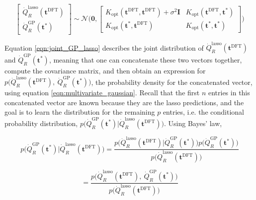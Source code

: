 \documentclass{article}
\begin{document}
\begin{equation}
  \label{eqn:joint_GP_lasso}
  \begin{bmatrix}
  \dot{Q}_{R}^{\text{lasso}}(\boldsymbol{t}^{\text{DFT}}) \\
  \dot{Q}_{R}^{\text{GP}}(\boldsymbol{t}^*)
  \end{bmatrix} \sim 
  \mathcal{N} \Bigg(\boldsymbol{0}, 
  \begin{bmatrix}
 K_{\text{opt}}(\boldsymbol{t}^{\text{DFT}}, \boldsymbol{t}^{\text{DFT}}) + \sigma^2\boldsymbol{I}& K_{\text{opt}}(\boldsymbol{t}^{\text{DFT}}, \boldsymbol{t}^*) \\ 
   K_{\text{opt}}(\boldsymbol{t}^*, \boldsymbol{t}^{\text{DFT}}) &  K_{\text{opt}}(\boldsymbol{t}^*, \boldsymbol{t}^*) 
  \end{bmatrix}
  \Bigg)
\end{equation}

Equation \ref{eqn:joint_GP_lasso} describes the joint distribution of $\dot{Q}_{R}^{\text{lasso}}(\boldsymbol{t}^{\text{DFT}})$ and $\dot{Q}_{R}^{\text{GP}}(\boldsymbol{t}^*)$, meaning that one can concatenate these two vectors together, compute the covariance matrix, and then obtain an expression for $p\Big(\dot{Q}_{R}^{\text{lasso}}(\boldsymbol{t}^{\text{DFT}}), \  \dot{Q}_{R}^{\text{GP}}(\boldsymbol{t}^*)\Big)$, the probability density for the concatenated vector, using equation \ref{eqn:multivariate_gaussian}. Recall that the first $n$ entries in this concatenated vector are known because they are the lasso predictions, and the goal is to learn the distribution for the remaining $p$ entries, i.e. the conditional probability distribution, $p\Big(\dot{Q}_{R}^{\text{GP}}(\boldsymbol{t}^*)  \Big| \dot{Q}_{R}^{\text{lasso}}(\boldsymbol{t}^{\text{DFT}})  \Big)$. Using Bayes' law, 

$$
p\Big(\dot{Q}_{R}^{\text{GP}}(\boldsymbol{t}^*)  \Big| \dot{Q}_{R}^{\text{lasso}}(\boldsymbol{t}^{\text{DFT}})  \Big) = \frac{p\Big(\dot{Q}_{R}^{\text{lasso}}(\boldsymbol{t}^{\text{DFT}})  \Big| \dot{Q}_{R}^{\text{GP}}(\boldsymbol{t}^*)\Big) p\Big(\dot{Q}_{R}^{\text{GP}}(\boldsymbol{t}^*)\Big)}{p\Big(\dot{Q}_{R}^{\text{lasso}}(\boldsymbol{t}^{\text{DFT}})\Big)}
$$

\begin{equation}
  \label{eqn:bayes_joint}
 = \frac{p\Big(\dot{Q}_{R}^{\text{lasso}}(\boldsymbol{t}^{\text{DFT}}), \  \dot{Q}_{R}^{\text{GP}}(\boldsymbol{t}^*)\Big)}{p\Big(\dot{Q}_{R}^{\text{lasso}}(\boldsymbol{t}^{\text{DFT}})\Big)}
\end{equation}
\end{document}
